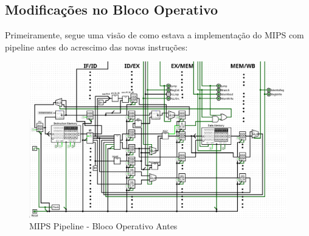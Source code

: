 \documentclass{report}
\begin{document}
        \subsection{Modificações no Bloco Operativo}
        Primeiramente, segue uma visão de como estava a implementação do MIPS com pipeline antes
        do acrescimo das novas instruções:
        \begin{figure}[h!]
            \centering
            \includegraphics[width=\linewidth]{images/prints/Pipeline/Bloco Operativo Pipeline Antes.png}
            \caption{\label{print:pipeline_ob_before} MIPS Pipeline - Bloco Operativo Antes}
        \end{figure}
\end{document}
